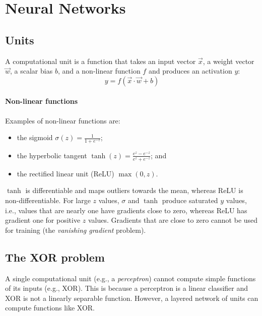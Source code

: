 \section{Neural Networks}

\subsection{Units}

\begin{dfn}
  \label{dfn:7:ComputationalUnit}
  A computational unit is a function that takes an input vector $\vec{x}$, a
  weight vector $\vec{w}$, a scalar bias $b$, and a non-linear function $f$ and
  produces an activation $y$:
  \begin{equation}
    y = f(\vec{x} \cdot \vec{w} + b)
  \end{equation}
\end{dfn}

\paragraph{Non-linear functions}

Examples of non-linear functions are:
\begin{itemize}
  \item the sigmoid $\sigma(z) = \frac{1}{1 + e^{-z}}$;
  \item the hyperbolic tangent $\tanh(z) = \frac{e^z - e^{-z}}{e^z + e^{-z}}$; and
  \item the rectified linear unit (ReLU) $\max(0, z)$.
\end{itemize}

$\tanh$ is differentiable and maps outliers towards the mean, whereas ReLU is
non-differentiable.
For large $z$ values, $\sigma$ and $\tanh$ produce saturated $y$ values, i.e.,
values that are nearly one have gradients close to zero, whereas ReLU has
gradient one for positive $z$ values.
Gradients that are close to zero cannot be used for training (the
\textit{vanishing gradient} problem).

\subsection{The XOR problem}

A single computational unit (e.g., a \textit{perceptron}) cannot compute simple
functions of its inputs (e.g., XOR).
This is because a perceptron is a linear classifier and XOR is not a linearly
separable function.
However, a layered network of units can compute functions like XOR.

